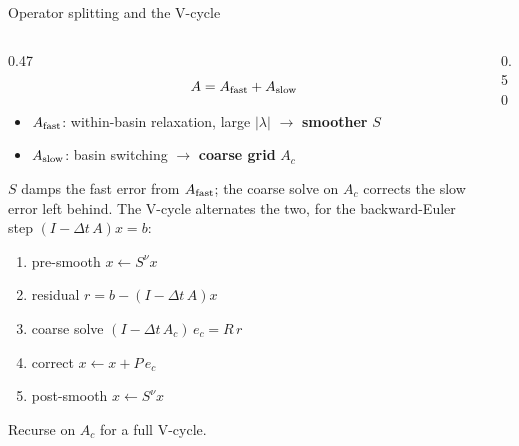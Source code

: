 \documentclass[10pt,aspectratio=169]{beamer}
\begin{document}
\begin{frame}{Operator splitting and the V-cycle}

  \begin{columns}[T]
    \begin{column}{0.47\textwidth}
      \[ A=A_{\rm fast}+A_{\rm slow} \]
      \begin{itemize}\setlength\itemsep{0.3em}
        \item $A_{\rm fast}$: within-basin relaxation, large $|\lambda|$
              $\to$ \textbf{smoother} $S$
        \item $A_{\rm slow}$: basin switching $\to$ \textbf{coarse grid} $A_c$
      \end{itemize}
      \smallskip
      $S$ damps the fast error from $A_{\rm fast}$; the coarse solve on $A_c$
      corrects the slow error left behind. The V-cycle alternates the two,
      for the backward-Euler step $(I-\Delta t\,A)x=b$:
      \begin{enumerate}\setlength\itemsep{0.18em}
        \item pre-smooth $x\leftarrow S^{\nu}x$
        \item residual $r=b-(I-\Delta t\,A)x$
        \item coarse solve $(I-\Delta t\,A_c)\,e_c=R\,r$
        \item correct $x\leftarrow x+P\,e_c$
        \item post-smooth $x\leftarrow S^{\nu}x$
      \end{enumerate}
      Recurse on $A_c$ for a full V-cycle.
    \end{column}
    \begin{column}{0.50\textwidth}
      \begin{center}
\end{center}
\end{column}
\end{columns}
\end{frame}
\end{document}
